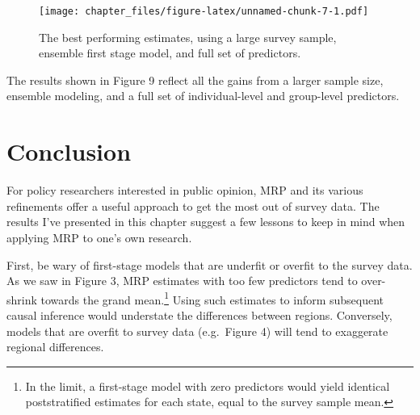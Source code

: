 \documentclass[
]{article}
\newenvironment{Shaded}{\begin{snugshade}}{\end{snugshade}}
\newcommand{\AttributeTok}[1]{\textcolor[rgb]{0.77,0.63,0.00}{#1}}
\newcommand{\CommentTok}[1]{\textcolor[rgb]{0.56,0.35,0.01}{\textit{#1}}}
\newcommand{\FunctionTok}[1]{\textcolor[rgb]{0.00,0.00,0.00}{#1}}
\newcommand{\NormalTok}[1]{#1}
\newcommand{\OtherTok}[1]{\textcolor[rgb]{0.56,0.35,0.01}{#1}}
\newcommand{\SpecialCharTok}[1]{\textcolor[rgb]{0.00,0.00,0.00}{#1}}
\begin{document}
\begin{Shaded}
\end{Shaded}

\begin{figure}
\centering
\texttt{[image: chapter\_files/figure-latex/unnamed-chunk-7-1.pdf]}
\caption{The best performing estimates, using a large survey sample,
ensemble first stage model, and full set of predictors.}
\end{figure}

The results shown in Figure 9 reflect all the gains from a larger sample
size, ensemble modeling, and a full set of individual-level and
group-level predictors.

\hypertarget{conclusion}{%
\section{Conclusion}\label{conclusion}}

For policy researchers interested in public opinion, MRP and its various
refinements offer a useful approach to get the most out of survey data.
The results I've presented in this chapter suggest a few lessons to keep
in mind when applying MRP to one's own research.

First, be wary of first-stage models that are underfit or overfit to the
survey data. As we saw in Figure 3, MRP estimates with too few
predictors tend to over-shrink towards the grand mean.\footnote{In the
  limit, a first-stage model with zero predictors would yield identical
  poststratified estimates for each state, equal to the survey sample
  mean.} Using such estimates to inform subsequent causal inference
would understate the differences between regions. Conversely, models
that are overfit to survey data (e.g.~Figure 4) will tend to exaggerate
regional differences.
\end{document}
